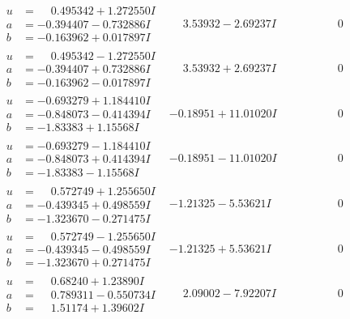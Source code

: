 \documentclass[1p]{elsarticle_modified}
\theoremstyle{definition}
\begin{document}
$$\begin{array}{c|c|c}
\begin{aligned}
u &= \phantom{-}0.495342 + 1.272550 I \\
a &= -0.394407 - 0.732886 I \\
b &= -0.163962 + 0.017897 I\end{aligned}
 & \phantom{-}3.53932 - 2.69237 I & \phantom{-0.000000 } 0 \\ \hline\begin{aligned}
u &= \phantom{-}0.495342 - 1.272550 I \\
a &= -0.394407 + 0.732886 I \\
b &= -0.163962 - 0.017897 I\end{aligned}
 & \phantom{-}3.53932 + 2.69237 I & \phantom{-0.000000 } 0 \\ \hline\begin{aligned}
u &= -0.693279 + 1.184410 I \\
a &= -0.848073 - 0.414394 I \\
b &= -1.83383 + 1.15568 I\end{aligned}
 & -0.18951 + 11.01020 I & \phantom{-0.000000 } 0 \\ \hline\begin{aligned}
u &= -0.693279 - 1.184410 I \\
a &= -0.848073 + 0.414394 I \\
b &= -1.83383 - 1.15568 I\end{aligned}
 & -0.18951 - 11.01020 I & \phantom{-0.000000 } 0 \\ \hline\begin{aligned}
u &= \phantom{-}0.572749 + 1.255650 I \\
a &= -0.439345 + 0.498559 I \\
b &= -1.323670 - 0.271475 I\end{aligned}
 & -1.21325 - 5.53621 I & \phantom{-0.000000 } 0 \\ \hline\begin{aligned}
u &= \phantom{-}0.572749 - 1.255650 I \\
a &= -0.439345 - 0.498559 I \\
b &= -1.323670 + 0.271475 I\end{aligned}
 & -1.21325 + 5.53621 I & \phantom{-0.000000 } 0 \\ \hline\begin{aligned}
u &= \phantom{-}0.68240 + 1.23890 I \\
a &= \phantom{-}0.789311 - 0.550734 I \\
b &= \phantom{-}1.51174 + 1.39602 I\end{aligned}
 & \phantom{-}2.09002 - 7.92207 I & \phantom{-0.000000 } 0 \\ \hline\begin{aligned}

\end{aligned}
\end{array}$$
\end{document}
